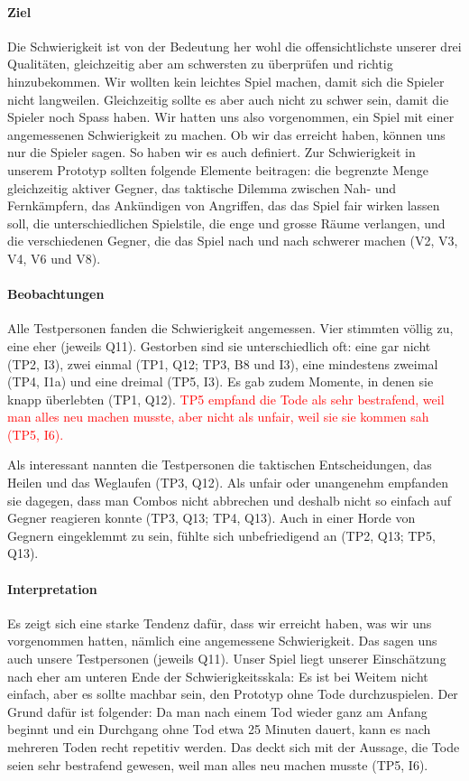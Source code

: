 \documentclass[../Main.tex]{subfiles}
\begin{document}
\paragraph{Ziel}
Die Schwierigkeit ist von der Bedeutung her wohl die offensichtlichste unserer drei Qualitäten, gleichzeitig aber am schwersten zu überprüfen und richtig hinzubekommen. Wir wollten kein leichtes Spiel machen, damit sich die Spieler nicht langweilen. Gleichzeitig sollte es aber auch nicht zu schwer sein, damit die Spieler noch Spass haben. Wir hatten uns also vorgenommen, ein Spiel mit einer angemessenen Schwierigkeit zu machen. Ob wir das erreicht haben, können uns nur die Spieler sagen. So haben wir es auch definiert. Zur Schwierigkeit in unserem Prototyp sollten folgende Elemente beitragen: die begrenzte Menge gleichzeitig aktiver Gegner, das taktische Dilemma zwischen Nah- und Fernkämpfern, das Ankündigen von Angriffen, das das Spiel fair wirken lassen soll, die unterschiedlichen Spielstile, die enge und grosse Räume verlangen, und die verschiedenen Gegner, die das Spiel nach und nach schwerer machen (V2, V3, V4, V6 und V8).

\paragraph{Beobachtungen}
Alle Testpersonen fanden die Schwierigkeit angemessen. Vier stimmten völlig zu, eine eher (jeweils Q11). Gestorben sind sie unterschiedlich oft: eine gar nicht (TP2, I3), zwei einmal (TP1, Q12; TP3, B8 und I3), eine mindestens zweimal (TP4, I1a) und eine dreimal (TP5, I3). Es gab zudem Momente, in denen sie knapp überlebten (TP1, Q12). \textcolor{red}{TP5 empfand die Tode als sehr bestrafend, weil man alles neu machen musste, aber nicht als unfair, weil sie sie kommen sah (TP5, I6).}

Als interessant nannten die Testpersonen die taktischen Entscheidungen, das Heilen und das Weglaufen (TP3, Q12). Als unfair oder unangenehm empfanden sie dagegen, dass man Combos nicht abbrechen und deshalb nicht so einfach auf Gegner reagieren konnte (TP3, Q13; TP4, Q13). Auch in einer Horde von Gegnern eingeklemmt zu sein, fühlte sich unbefriedigend an (TP2, Q13; TP5, Q13).

\paragraph{Interpretation}
Es zeigt sich eine starke Tendenz dafür, dass wir erreicht haben, was wir uns vorgenommen hatten, nämlich eine angemessene Schwierigkeit. Das sagen uns auch unsere Testpersonen (jeweils Q11). Unser Spiel liegt unserer Einschätzung nach eher am unteren Ende der Schwierigkeitsskala: Es ist bei Weitem nicht einfach, aber es sollte machbar sein, den Prototyp ohne Tode durchzuspielen. Der Grund dafür ist folgender: Da man nach einem Tod wieder ganz am Anfang beginnt und ein Durchgang ohne Tod etwa 25 Minuten dauert, kann es nach mehreren Toden recht repetitiv werden. Das deckt sich mit der Aussage, die Tode seien sehr bestrafend gewesen, weil man alles neu machen musste (TP5, I6).
\end{document}
